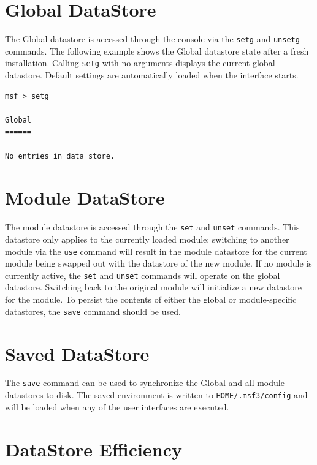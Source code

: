 \documentclass{report}
\begin{document}
    \section{Global DataStore}
    \label{ENV-GLOBAL}

\par
The Global datastore is accessed through the console via the \texttt{setg} and
\texttt{unsetg} commands. The following example shows the Global datastore state
after a fresh installation. Calling \texttt{setg} with no arguments displays the
current global datastore. Default settings are automatically loaded when the
interface starts.

\begin{verbatim}
msf > setg

Global
======

No entries in data store.

\end{verbatim}

    \section{Module DataStore}
    \label{ENV-TEMP}

\par
The module datastore is accessed through the \texttt{set} and \texttt{unset}
commands. This datastore only applies to the currently loaded module; switching
to another module via the \texttt{use} command will result in the module
datastore for the current module being swapped out with the datastore of the new
module. If no module is currently active, the \texttt{set} and \texttt{unset}
commands will operate on the global datastore. Switching back to the original
module will initialize a new datastore for the module. To persist the contents
of either the global or module-specific datastores, the \texttt{save} command
should be used.

    \section{Saved DataStore}
    \label{ENV-SAVE}

\par
The \texttt{save} command can be used to synchronize the Global and all module
datastores to disk. The saved environment is written to
\texttt{HOME/.msf3/config} and will be loaded when any of the user interfaces
are executed.

    \section{DataStore Efficiency}
    \label{ENV-EFF}
\end{document}
